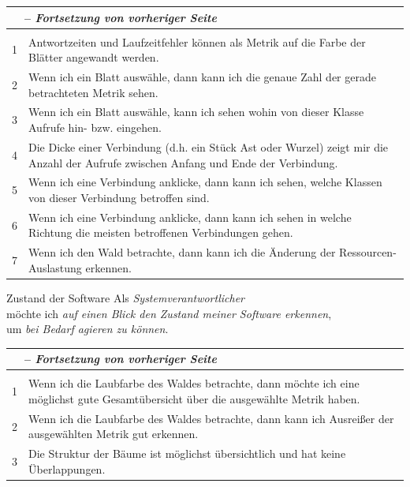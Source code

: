 \newcommand{\tableheader}{
\endfirsthead
\multicolumn{2}{l}{\small \tablename\ \thetable\ -- \textit{Fortsetzung von vorheriger Seite}} \\
\hline
  \endhead
  \hline
  \endlastfoot
  \hline
\multicolumn{2}{r}{\textit{\small Fortsetzung auf nächster Seite...}} \\
\endfoot
\hline
}
\renewcommand{\arraystretch}{1.5}
\begin{tabularx}{\textwidth}{lX}
	\caption{Akzeptanzkriterien zu Userstory 1}\label{tab:static-metrics} \\
	\tableheader
    1 & Antwortzeiten und Laufzeitfehler können als Metrik auf die Farbe der Blätter angewandt werden.\\
    2 & Wenn ich ein Blatt auswähle, dann kann ich die genaue Zahl der gerade betrachteten Metrik sehen.\\
    3 & Wenn ich ein Blatt auswähle, kann ich sehen wohin von dieser Klasse Aufrufe hin- bzw. eingehen.\\
    4 & Die Dicke einer Verbindung (d.h. ein Stück Ast oder Wurzel) zeigt mir die Anzahl der Aufrufe zwischen Anfang und Ende der Verbindung.\\
    5 & Wenn ich eine Verbindung anklicke, dann kann ich sehen, welche Klassen von dieser Verbindung betroffen sind.\\
    6 & Wenn ich eine Verbindung anklicke, dann kann ich sehen in welche Richtung die meisten betroffenen Verbindungen gehen.\\
    7 & Wenn ich den Wald betrachte, dann kann ich die Änderung der Ressourcen-Auslastung erkennen.
\end{tabularx}

\begin{userstory}{Zustand der Software}
  Als \textit{Systemverantwortlicher}\\
  möchte ich \textit{auf einen Blick den Zustand meiner Software erkennen},\\
  um \textit{bei Bedarf agieren zu können}.
\end{userstory}

\begin{tabularx}{\textwidth}{lX}
	\caption{Akzeptanzkriterien zu Userstory 2}\label{tab:static-metrics} \\
	\tableheader
    1 & Wenn ich die Laubfarbe des Waldes betrachte, dann möchte ich eine möglichst gute Gesamtübersicht über die ausgewählte Metrik haben.\\
    2 & Wenn ich die Laubfarbe des Waldes betrachte, dann kann ich Ausreißer der ausgewählten Metrik gut erkennen.\\
    3 & Die Struktur der Bäume ist möglichst übersichtlich und hat keine Überlappungen.
\end{tabularx}

